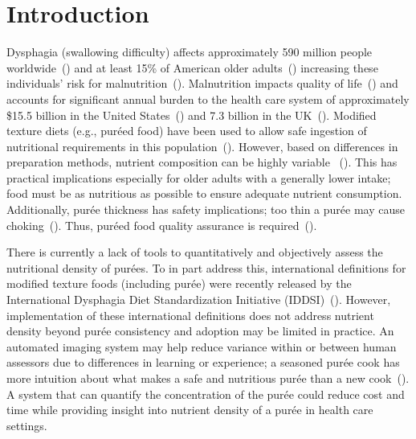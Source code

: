 \documentclass[authoryear]{elsarticle}
\begin{document}
\section{Introduction}
Dysphagia (swallowing difficulty) affects approximately 590 million people worldwide~(\cite{Cichero2016}) and at least 15\% of American older adults~(\cite{sura2012}) increasing these individuals' risk for malnutrition~(\cite{ilhamto2014,sura2012}). Malnutrition impacts quality of life~(\cite{keller2004}) and accounts for significant annual burden to the health care system of approximately \$15.5 billion in the United States~(\cite{goates2016}) and 7.3 billion in the UK~(\cite{russell2007}). Modified texture diets (e.g., pur\' eed food) have been used to allow safe ingestion of nutritional requirements in this population~(\cite{germain2006}). However, based on differences in preparation methods, nutrient composition can be highly variable ~(\cite{ilhamto2014}). This has practical implications especially for older adults with a generally lower intake; food must be as nutritious as possible to ensure adequate nutrient consumption. Additionally, pur\' ee thickness has safety implications; too thin a pur\' ee may cause choking~(\cite{ilhamto2014}). Thus, pur\' eed food quality assurance is required~(\cite{ilhamto2014}).

There is currently a lack of tools to quantitatively and objectively assess the nutritional density of pur\' ees. To in part address this, international definitions for modified texture foods (including pur\' ee) were recently released by the International Dysphagia Diet Standardization Initiative (IDDSI)~(\cite{Cichero2016}).  However, implementation of these international definitions does not address nutrient density beyond pur\' ee consistency and adoption may be limited in practice. An automated imaging system may help reduce variance within or between human assessors due to differences in learning or experience; a seasoned pur\' ee cook has more intuition about what makes a safe and nutritious pur\' ee than a new cook~(\cite{ilhamto2014}). A system that can quantify the concentration of the pur\' ee could reduce cost and time while providing insight into nutrient density of a pur\' ee in health care settings.
\end{document}
